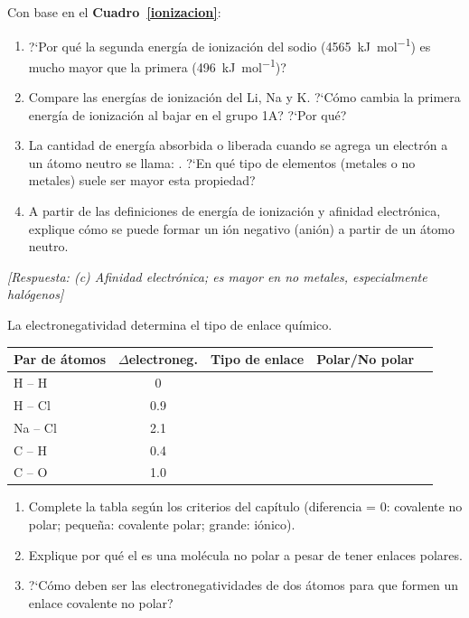 \begin{bloque_ejercicios}
\begin{ejercicios}
\item Con base en el \textbf{Cuadro~\ref{ionizacion}}:

\begin{enumerate}[label=\alph*)]
    \item ?`Por qu\'e la segunda energ\'ia de ionizaci\'on del sodio
          (\SI{4565}{\kilo\joule\per\mole}) es mucho mayor que la
          primera (\SI{496}{\kilo\joule\per\mole})?
    \item Compare las energ\'ias de ionizaci\'on del Li, Na y K.
          ?`C\'omo cambia la primera energ\'ia de ionizaci\'on al
          bajar en el grupo 1A? ?`Por qu\'e?
    \item La cantidad de energ\'ia absorbida o liberada cuando se
          agrega un electr\'on a un \'atomo neutro se llama:
          \underline{\hspace{4cm}}. ?`En qu\'e tipo de elementos
          (metales o no metales) suele ser mayor esta propiedad?
    \item A partir de las definiciones de energ\'ia de ionizaci\'on y
          afinidad electr\'onica, explique c\'omo se puede formar un
          i\'on negativo (ani\'on) a partir de un \'atomo neutro.
\end{enumerate}

\textit{[Respuesta: (c) Afinidad electr\'onica;
es mayor en no metales, especialmente hal\'ogenos]}

\item La electronegatividad determina el tipo de enlace qu\'imico.

{%
\centering
\begin{tabular}{lcccl}
\toprule
\textbf{Par de \'atomos} & $\Delta$electroneg. & \textbf{Tipo de enlace} &
\textbf{Polar/No polar} \\
\midrule
H -- H       & 0    & & \\
H -- Cl      & 0.9  & & \\
Na -- Cl     & 2.1  & & \\
C -- H       & 0.4  & & \\
C -- O       & 1.0  & & \\
\bottomrule
\end{tabular}
\par
}%

\begin{enumerate}[label=\alph*)]
    \item Complete la tabla seg\'un los criterios del cap\'itulo
          (diferencia = 0: covalente no polar; peque\~na: covalente
          polar; grande: i\'onico).
    \item Explique por qu\'e el  es una mol\'ecula no polar
          a pesar de tener enlaces  polares.
    \item ?`C\'omo deben ser las electronegatividades de dos \'atomos
          para que formen un enlace covalente no polar?
\end{enumerate}


\end{ejercicios}
\end{bloque_ejercicios}
